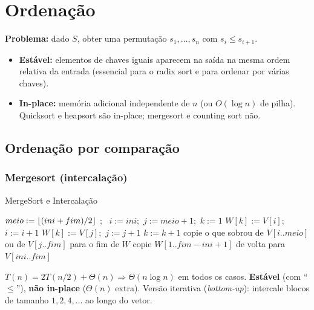 \section{Ordenação}\label{sec:ordenacao}
\textbf{Problema:} dado $S$, obter uma permutação $s_1,\dots,s_n$ com $s_i\le s_{i+1}$.
\begin{itemize}
  \item \textbf{Estável:} elementos de chaves iguais aparecem na saída na mesma ordem relativa da entrada (essencial para o radix sort e para ordenar por várias chaves).
  \item \textbf{In-place:} memória adicional independente de $n$ (ou $O(\log n)$ de pilha). Quicksort e heapsort são in-place; mergesort e counting sort não.
\end{itemize}

\subsection{Ordenação por comparação}\label{sec:sortcomp}
\subsubsection*{Mergesort (intercalação)}
\begin{pseudo}{MergeSort e Intercalação}
\begin{algorithmic}
    \State $meio:=\lfloor(ini+fim)/2\rfloor$
    \State {};\ 
    \State {}
  \EndIf
\EndProcedure
{}
  \State $i:=ini$;\ $j:=meio+1$;\ $k:=1$ 
     \State $W[k]:=V[i]$;\ $i:=i+1$ 
    \Else \State $W[k]:=V[j]$;\ $j:=j+1$
    \EndIf
    \State $k:=k+1$
  \EndWhile
  \State copie o que sobrou de $V[i..meio]$ ou de $V[j..fim]$ para o fim de $W$
  \State copie $W[1..fim-ini+1]$ de volta para $V[ini..fim]$
\EndProcedure
\end{algorithmic}
\end{pseudo}
$T(n)=2T(n/2)+\Theta(n)\Rightarrow\Theta(n\log n)$ em todos os casos. \textbf{Estável} (com ``$\le$''), \textbf{não in-place} ($\Theta(n)$ extra). Versão iterativa (\emph{bottom-up}): intercale blocos de tamanho $1,2,4,\dots$ ao longo do vetor.

